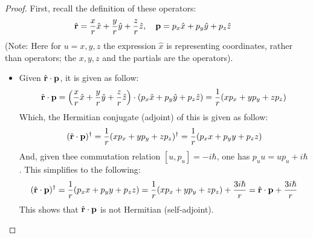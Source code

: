 \documentclass{article}
\begin{document}
\begin{proof}
    First, recall the definition of these operators:
    \begin{align}
        &\hat{\mathbf{r}} = \frac{x}{r}\hat{x}+\frac{y}{r}\hat{y}+\frac{z}{r}\hat{z},\quad \mathbf{p} = p_x\hat{x}+p_y\hat{y}+p_z\hat{z}
    \end{align}
    (Note: Here for $u=x,y,z$ the expression $\hat{x}$ is representing coordinates, rather than operators; the $x,y,z$ and the partials are the operators).

    \hfil

    \begin{itemize}
        \item[(a)] Given $\hat{\mathbf{r}}\cdot \mathbf{p}$, it is given as follow:
        \begin{align}
            \hat{\mathbf{r}}\cdot \mathbf{p} = \left(\frac{x}{r}\hat{x}+\frac{y}{r}\hat{y}+\frac{z}{r}\hat{z}\right)\cdot \left(p_x\hat{x}+p_y\hat{y}+p_z\hat{z}\right) = \frac{1}{r}(x p_x+y p_y+z p_z)
        \end{align}
        Which, the Hermitian conjugate (adjoint) of this is given as follow:
        \begin{align}
            (\hat{\mathbf{r}}\cdot\mathbf{p})^\dagger = \frac{1}{r}(x p_x+yp_y+zp_z)^\dagger = \frac{1}{r}(p_x x+p_y y + p_z z)
        \end{align}
        And, given thee commutation relation $[u,p_u] = -i\hbar$, one has $p_u u = u p_u + i\hbar$. This simplifies to the following:
        \begin{align}
            (\hat{\mathbf{r}}\cdot \mathbf{p})^\dagger = \frac{1}{r}(p_x x+p_y y+p_z z) = \frac{1}{r}(x p_x+yp_y+zp_z) + \frac{3i\hbar}{r} = \hat{\mathbf{r}}\cdot \mathbf{p}+ \frac{3i\hbar}{r}
        \end{align}
        This shows that $\hat{\mathbf{r}}\cdot \mathbf{p}$ is not Hermitian (self-adjoint).

        \hfil


\end{itemize}
\end{proof}
\end{document}
